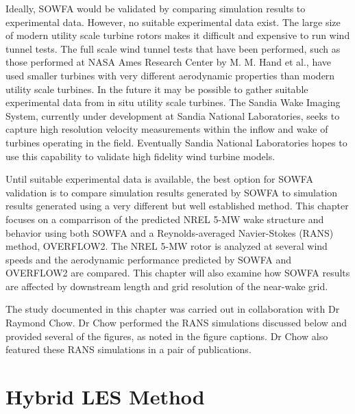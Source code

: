 Ideally, SOWFA would be validated by comparing simulation results to experimental data. However, no suitable experimental data exist. The large size of modern utility scale turbine rotors makes it difficult and expensive to run wind tunnel tests. The full scale wind tunnel tests that have been performed, such as those performed at NASA Ames Research Center by M. M. Hand et al.,\cite{simms2001} have used smaller turbines with very different aerodynamic properties than modern utility scale turbines. In the future it may be possible to gather suitable experimental data from in situ utility scale turbines. The Sandia Wake Imaging System, currently under development at Sandia National Laboratories,\cite{herges2015,naughton2015,herges2015a} seeks to capture high resolution velocity measurements within the inflow and wake of turbines operating in the field. Eventually Sandia National Laboratories hopes to use this capability to validate high fidelity wind turbine models.\cite{ herges2015a}

Until suitable experimental data is available, the best option for SOWFA validation is to compare simulation results generated by SOWFA to simulation results generated using a very different but well established method. This chapter focuses on a comparrison of the predicted NREL 5-MW wake structure and behavior using both SOWFA and a Reynolds-averaged Navier-Stokes (RANS) method, OVERFLOW2. The NREL 5-MW rotor is analyzed at several wind speeds and the aerodynamic performance predicted by SOWFA and OVERFLOW2 are compared. This chapter will also examine how SOWFA results are affected by downstream length and grid resolution of the near-wake grid.

The study documented in this chapter was carried out in collaboration with Dr Raymond Chow.  Dr Chow performed the RANS simulations discussed below and provided several of the figures, as noted in the figure captions. Dr Chow also featured these RANS simulations in a pair of publications.\cite{chow2012,chow2013}


\section{Hybrid LES Method}\label{section5-2}

